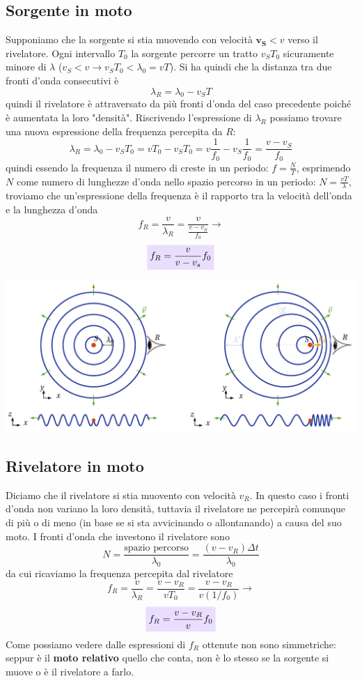 \documentclass[x11names]{report}
\newcommand{\viola}[1]{\colorbox{yred}{$\displaystyle #1$}}
\begin{document}
	\subsection{Sorgente in moto}
	Supponiamo che la sorgente si stia muovendo con velocità \(\boldsymbol{v_S} < v\) verso il rivelatore. Ogni intervallo \(T_0\) la sorgente percorre un tratto \(v_ST_0\) sicuramente minore di \(\lambda\) (\(v_S < v \to v_ST_0 < \lambda_0= vT\)). Si ha quindi che la distanza tra due fronti d'onda consecutivi è
	\[ 
	\lambda_R = \lambda_0 - v_ST
	\]
	quindi il rivelatore è attraversato da più fronti d'onda del caso precedente poiché è aumentata la loro "densità". Riscrivendo l'espressione di \(\lambda_R\) possiamo trovare una nuova espressione della frequenza percepita da \(R\): 
	\[ 
	\lambda_R = \lambda_0 - v_ST_0 = vT_0 - v_ST_0 = v\frac{1}{f_0} - v_S\frac{1}{f_0} = \frac{v - v_S}{f_0}
	\]
	quindi essendo la frequenza il numero di creste in un periodo: \(f =\frac{N}{T}\), esprimendo \(N\) come numero di lunghezze d'onda nello spazio percorso in un periodo: \(N = \frac{vT}{\lambda}\), troviamo che un'espressione della frequenza è il rapporto tra la velocità dell'onda e la lunghezza d'onda 
	\[ 
	f_R = \frac{v}{\lambda_R} = \frac{v}{\frac{v - v_S}{f_0}} \to
	\]
	\begin{equation}
		\viola{f_R = \frac{v}{v - v_s}f_0}
	\end{equation}
	
	\begin{center}
		\includegraphics[scale=0.4]{imgs/doppler.png}
	\end{center}
	
	\subsection{Rivelatore in moto}
	Diciamo che il rivelatore si stia muovento con velocità \(v_R\). In questo caso i fronti d'onda non variano la loro densità, tuttavia il rivelatore ne percepirà comunque di più o di meno (in base se si sta avvicinando o allontanando) a causa del suo moto. I fronti d'onda che investono il rivelatore sono
	\[ 
	N = \frac{\text{spazio percorso}}{\lambda_0} = \frac{(v - v_R)\Delta t}{\lambda_0}
	\]
	da cui ricaviamo la frequenza percepita dal rivelatore
	\[ 
	f_R = \frac{v}{\lambda_R} = \frac{v - v_R}{vT_0} = \frac{v - v_R}{v(1/f_0)} \to
	\]
	\begin{equation}
		\viola{f_R = \frac{v - v_R}{v}f_0}
	\end{equation}
	Come possiamo vedere dalle espressioni di \(f_R\) ottenute non sono simmetriche: seppur è il \textbf{moto relativo} quello che conta, non è lo stesso se la sorgente si muove o è il rivelatore a farlo.
	
\end{document}
